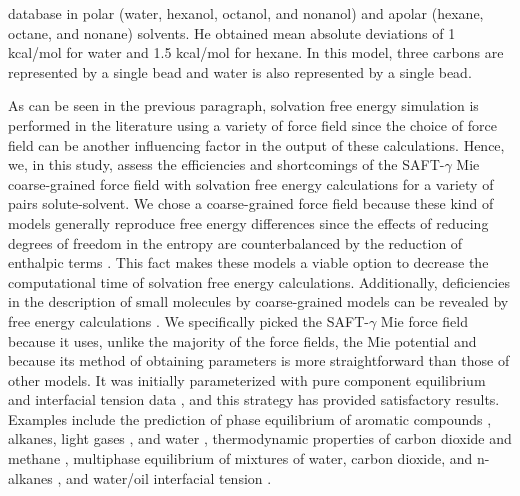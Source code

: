 \documentclass[final,12p,times,twocolumn]{elsarticle}
\begin{document}
	database in polar (water, hexanol, octanol, and nonanol) and apolar (hexane, octane, and nonane) solvents. He obtained mean absolute deviations of 1 kcal/mol for water and 1.5 kcal/mol for hexane. In this model, three carbons are represented by a single bead and water is also represented by a single bead. 	

	As can be seen in the previous paragraph, solvation free energy simulation is performed in the literature using a variety of force field since the choice of force field can be another influencing factor in the output of these calculations. Hence, we, in this study, assess the efficiencies and shortcomings of the SAFT-$\gamma$ Mie coarse-grained force field  \cite{avendano2011} with solvation free energy calculations for a variety of pairs solute-solvent. We chose a coarse-grained force field because these kind of models generally reproduce free energy differences since the effects of reducing degrees of freedom in the entropy are counterbalanced by the reduction of enthalpic terms \cite{kmiecik2016}. This fact makes these models a viable option to decrease the computational time of solvation free energy calculations. Additionally, deficiencies in the description of small molecules by coarse-grained models can be revealed by free energy calculations \cite{mobley2007,shirts2013}. We specifically picked  the SAFT-$\gamma$ Mie force field because it uses, unlike the majority of the force fields, the Mie potential \cite{MIE} and because its method of obtaining parameters is more straightforward than those of other models. It was initially parameterized with pure component equilibrium and interfacial tension data \cite{avendano2011}, and this strategy has provided satisfactory results. Examples include the prediction of phase equilibrium of aromatic compounds \cite{muller2017}, alkanes, light gases \cite{herdes2015}, and water \cite{lobanova2015}, thermodynamic properties of carbon dioxide and methane \cite{cassiano1}, multiphase equilibrium of mixtures of water, carbon dioxide, and n-alkanes \cite{lobanova2016}, and water/oil interfacial tension \cite{herdes2017}.
\end{document}

